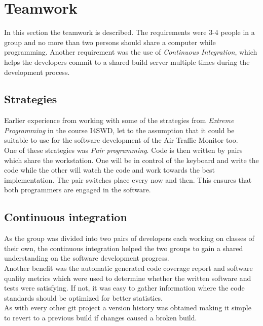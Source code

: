 \section{Teamwork}
In this section the teamwork is described. The requirements were 3-4 people in a group and no more than two persons should share a computer while programming. Another requirement was the use of \emph{Continuous Integration}, which helps the developers commit to a shared build server multiple times during the development process.

\subsection{Strategies}
Earlier experience from working with some of the strategies from \emph{Extreme Programming} in the course I4SWD, let to the assumption that it could be suitable to use for the software development of the Air Traffic Monitor too. \\
One of these strategies was \emph{Pair programming}. Code is then written by pairs which share the workstation. One will be in control of the keyboard and write the code while the other will watch the code and work towards the best implementation. The pair switches place every now and then. This ensures that both programmers are engaged in the software.

\subsection{Continuous integration}
As the group was divided into two pairs of developers each working on classes of their own, the continuous integration helped the two groups to gain a shared understanding on the software development progress.\\ 
Another benefit was the automatic generated code coverage report and software quality metrics which were used to determine whether the written software and tests were satisfying. If not, it was easy to gather information where the code standards should be optimized for better statistics.\\ 
As with every other git project a version history was obtained making it simple to revert to a previous build if changes caused a broken build.\\